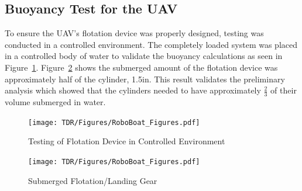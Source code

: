 \documentclass[letterpaper, 12 pt, conference]{ieeeconf}
\begin{document}
\subsection{Buoyancy Test for the UAV}
%
To ensure the UAV's flotation device was properly designed, testing was conducted in a controlled environment. The completely loaded system was placed in a controlled body of water to validate the buoyancy calculations as seen in Figure~\ref{fig:FloatTesting}. Figure~\ref{fig:Underwater} shows the submerged amount of the flotation device was approximately half of the cylinder, 1.5in. This result validates the preliminary analysis which showed that the cylinders needed to have approximately $\frac{2}{3}$ of their volume submerged in water. 
\begin{figure}[tb]
\vspace{0.05in}
\centering
\texttt{[image: TDR/Figures/RoboBoat\_Figures.pdf]}
\caption{Testing of Flotation Device in Controlled Environment}
\label{fig:FloatTesting}
\end{figure}
% 
%
\begin{figure}[tb]
\centering
\texttt{[image: TDR/Figures/RoboBoat\_Figures.pdf]}
\caption{Submerged Flotation/Landing Gear}
\label{fig:Underwater}
\end{figure}
% 
\end{document}
